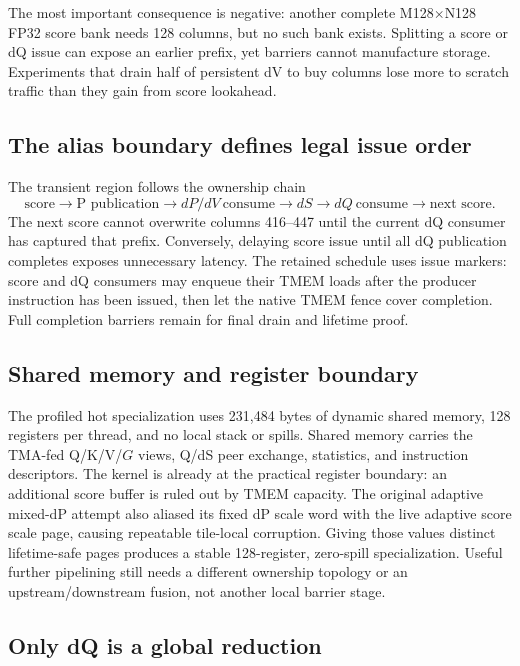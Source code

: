 The most important consequence is negative: another complete M128$\times$N128
FP32 score bank needs 128 columns, but no such bank exists.  Splitting a score
or dQ issue can expose an earlier prefix, yet barriers cannot manufacture
storage.  Experiments that drain half of persistent dV to buy columns lose
more to scratch traffic than they gain from score lookahead.

\subsection{The alias boundary defines legal issue order}

The transient region follows the ownership chain
\begin{equation}
  \text{score}\rightarrow
  \text{P publication}\rightarrow
  dP/dV\ \text{consume}\rightarrow
  dS\rightarrow dQ\ \text{consume}\rightarrow
  \text{next score}.
  \label{eq:bwd-alias-chain}
\end{equation}
The next score cannot overwrite columns 416--447 until the current dQ
consumer has captured that prefix.  Conversely, delaying score issue until
all dQ publication completes exposes unnecessary latency.  The retained
schedule uses issue markers: score and dQ consumers may enqueue their TMEM
loads after the producer instruction has been issued, then let the native
TMEM fence cover completion.  Full completion barriers remain for final
drain and lifetime proof.

\subsection{Shared memory and register boundary}

The profiled hot specialization uses 231,484 bytes of dynamic shared memory,
128 registers per thread, and no local stack or spills.  Shared memory carries
the TMA-fed Q/K/V/$G$ views, Q/dS peer exchange, statistics, and instruction
descriptors.  The kernel is already at the practical register boundary:
an additional score buffer is ruled out by TMEM capacity.  The original
adaptive mixed-dP attempt also aliased its fixed dP scale word with the live
adaptive score scale page, causing repeatable tile-local corruption.  Giving
those values distinct lifetime-safe pages produces a stable 128-register,
zero-spill specialization.  Useful further pipelining still needs a different
ownership topology or an upstream/downstream fusion, not another local barrier
stage.

\subsection{Only dQ is a global reduction}

